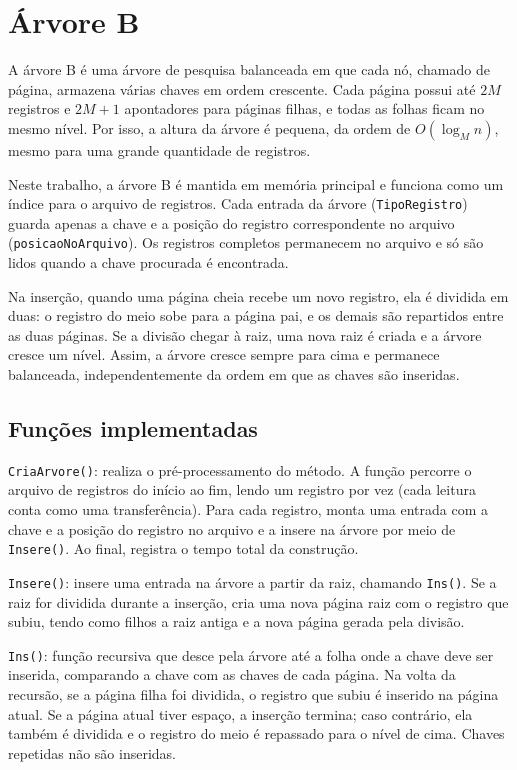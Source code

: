 \documentclass[12pt,a4paper]{article}
\begin{document}
\newpage

\section{Árvore B}

A árvore B é uma árvore de pesquisa balanceada em que cada nó, chamado de página,
armazena várias chaves em ordem crescente. Cada página possui até $2M$ registros e
$2M+1$ apontadores para páginas filhas, e todas as folhas ficam no mesmo nível. Por
isso, a altura da árvore é pequena, da ordem de $O(\log_M n)$, mesmo para uma grande
quantidade de registros.

Neste trabalho, a árvore B é mantida em memória principal e funciona como um índice
para o arquivo de registros. Cada entrada da árvore (\texttt{TipoRegistro}) guarda apenas
a chave e a posição do registro correspondente no arquivo (\texttt{posicaoNoArquivo}).
Os registros completos permanecem no arquivo e só são lidos quando a chave procurada é
encontrada.

Na inserção, quando uma página cheia recebe um novo registro, ela é dividida em duas:
o registro do meio sobe para a página pai, e os demais são repartidos entre as duas
páginas. Se a divisão chegar à raiz, uma nova raiz é criada e a árvore cresce um nível.
Assim, a árvore cresce sempre para cima e permanece balanceada, independentemente da
ordem em que as chaves são inseridas.

\newpage

\subsection{Funções implementadas}

\texttt{CriaArvore()}: realiza o pré-processamento do método. A função percorre o
arquivo de registros do início ao fim, lendo um registro por vez (cada leitura conta
como uma transferência). Para cada registro, monta uma entrada com a chave e a posição
do registro no arquivo e a insere na árvore por meio de \texttt{Insere()}. Ao final,
registra o tempo total da construção.

\texttt{Insere()}: insere uma entrada na árvore a partir da raiz, chamando
\texttt{Ins()}. Se a raiz for dividida durante a inserção, cria uma nova página raiz
com o registro que subiu, tendo como filhos a raiz antiga e a nova página gerada pela
divisão.

\texttt{Ins()}: função recursiva que desce pela árvore até a folha onde a chave deve
ser inserida, comparando a chave com as chaves de cada página. Na volta da recursão, se
a página filha foi dividida, o registro que subiu é inserido na página atual. Se a
página atual tiver espaço, a inserção termina; caso contrário, ela também é dividida e
o registro do meio é repassado para o nível de cima. Chaves repetidas não são inseridas.
\end{document}

